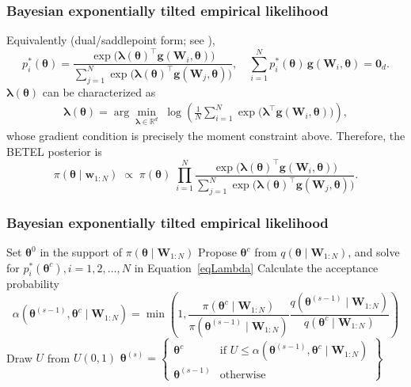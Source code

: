 \documentclass[12pt, compress]{beamer}
\begin{document}
\begin{frame}
	\frametitle{Bayesian exponentially tilted empirical likelihood}
Equivalently (dual/saddlepoint form; see \cite{schennach2005betel,schennach2007etel,chib2018moment}),
\[
p_i^{*}(\boldsymbol{\theta})
=\frac{\exp\!\big(\boldsymbol{\lambda}(\boldsymbol{\theta})^{\top}\mathbf{g}(\mathbf{W}_i,\boldsymbol{\theta})\big)}
{\sum_{j=1}^N \exp\!\big(\boldsymbol{\lambda}(\boldsymbol{\theta})^{\top}\mathbf{g}(\mathbf{W}_j,\boldsymbol{\theta})\big)}, \quad
\sum_{i=1}^N p_i^{*}(\boldsymbol{\theta})\,\mathbf{g}(\mathbf{W}_i,\boldsymbol{\theta})=\mathbf{0}_d.
\]
$\boldsymbol{\lambda}(\boldsymbol{\theta})$ can be characterized as
\begin{align}\label{eqLambda}
\boldsymbol{\lambda}(\boldsymbol{\theta})
=\arg\min_{\boldsymbol{\lambda}\in\mathbb{R}^{d}}
\;\log\!\left(\frac{1}{N}\sum_{i=1}^N
\exp\!\big(\boldsymbol{\lambda}^{\top}\mathbf{g}(\mathbf{W}_i,\boldsymbol{\theta})\big)\right),
\end{align}
whose gradient condition is precisely the moment constraint above. Therefore, the BETEL posterior is
\[
\pi(\boldsymbol{\theta}\mid \mathbf{w}_{1:N})
\;\propto\;
\pi(\boldsymbol{\theta})\;
\prod_{i=1}^N
\frac{\exp\!\big(\boldsymbol{\lambda}(\boldsymbol{\theta})^{\top}\mathbf{g}(\mathbf{W}_i,\boldsymbol{\theta})\big)}
{\sum_{j=1}^N \exp\!\big(\boldsymbol{\lambda}(\boldsymbol{\theta})^{\top}\mathbf{g}(\mathbf{W}_j,\boldsymbol{\theta})\big)}.
\]
\end{frame}

\begin{frame}
	\frametitle{Bayesian exponentially tilted empirical likelihood}
    \small
\begin{algorithm}[H]
	\caption{Bayesian Exponentially Tilted Empirical Likelihood: Metropolis-Hastings algorithm}\label{BETEL}
	\begin{algorithmic}
		\State Set $\boldsymbol{\theta}^0$ in the support of $\pi(\boldsymbol{\theta}\mid \mathbf{W}_{1:N})$ 
			\State Propose $\boldsymbol{\theta}^c$ from $q(\boldsymbol{\theta}\mid \mathbf{W}_{1:N})$, and solve for $p_i^{*}(\boldsymbol{\theta}^c), i=1,2,\dots,N$ in Equation~\ref{eqLambda} 
			\State Calculate the acceptance probability
            {\small{
			\[
			\alpha(\boldsymbol{\theta}^{(s-1)},\boldsymbol{\theta}^c\mid \mathbf{W}_{1:N})=\min\left(1,\frac{\pi(\boldsymbol{\theta}^{c}\mid \mathbf{W}_{1:N})}{\pi(\boldsymbol{\theta}^{(s-1)}\mid \mathbf{W}_{1:N})}\frac{q(\boldsymbol{\theta}^{(s-1)}\mid \mathbf{W}_{1:N})}{q(\boldsymbol{\theta}^{c}\mid \mathbf{W}_{1:N})}\right)
			\]
            }}
			\State Draw $U$ from $U(0,1)$
			\State $\boldsymbol{\theta}^{(s)}=\begin{Bmatrix}
			\boldsymbol{\theta}^{c} & \text{if }U\leq \alpha(\boldsymbol{\theta}^{(s-1)},\boldsymbol{\theta}^c\mid \mathbf{W}_{1:N})\\
			 \boldsymbol{\theta}^{(s-1)} & \text{otherwise}
		\end{Bmatrix}$
		\EndFor  
	\end{algorithmic}
\end{algorithm}
\end{frame}
\end{document}
